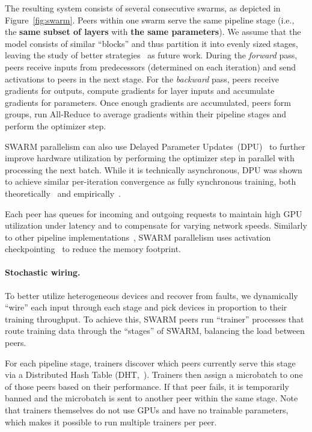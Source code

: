 The resulting system consists of several consecutive swarms, as depicted in Figure~\ref{fig:swarm}. Peers within one swarm serve the same pipeline stage (i.e., the \textbf{same subset of layers} with \textbf{the same parameters}).
We assume that the model consists of similar ``blocks'' and thus partition it into evenly sized stages, leaving the study of better strategies~\citep{huang2019gpipe,pipedream} as future work.
During the \textit{forward} pass, peers receive inputs from predecessors (determined on each iteration) and send activations to peers in the next stage. For the \textit{backward} pass, peers receive gradients for outputs, compute gradients for layer inputs and accumulate gradients for parameters. Once enough gradients are accumulated, peers form groups, run All-Reduce to average gradients within their pipeline stages and perform the optimizer step.

SWARM parallelism can also use Delayed Parameter Updates~(DPU)~\citep{zerooffload} to further improve hardware utilization by performing the optimizer step in parallel with processing the next batch. While it is technically asynchronous, DPU was shown to achieve similar per-iteration convergence as fully synchronous training, both theoretically~\citep{stich2020error,arjevani2020tight} and empirically~\citep{zerooffload,dedloc}.

Each peer has queues for incoming and outgoing requests to maintain high GPU utilization under latency and to compensate for varying network speeds. Similarly to other pipeline implementations~\citep{huang2019gpipe,megatron2}, SWARM parallelism uses activation checkpointing~\citep{gradient_checkpointing_autograd, gradient_checkpointing_dl} to reduce the memory footprint. %


\vspace{-6pt}
\paragraph{Stochastic wiring.} To better utilize heterogeneous devices and recover from faults, we dynamically ``wire'' each input through each stage and pick devices in proportion to their training throughput. To achieve this, SWARM peers run ``trainer'' processes that route training data through the ``stages'' of SWARM, balancing the load between peers.

For each pipeline stage, trainers discover which peers currently serve this stage via a Distributed Hash Table (DHT,~\citealp{kademlia}). Trainers then assign a microbatch to one of those peers based on their performance. If that peer fails, it is temporarily banned and the microbatch is sent to another peer within the same stage. Note that trainers themselves do not use GPUs and have no trainable parameters, which makes it possible to run multiple trainers per peer. 

